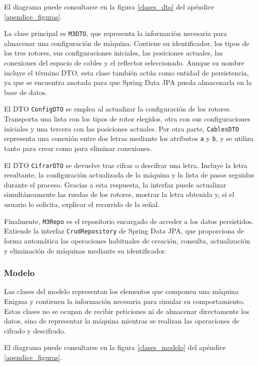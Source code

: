 El diagrama puede consultarse en la figura \ref{clases_dto} del apéndice \ref{apendice_figuras}.

La clase principal es \texttt{M3DTO}, que representa la información necesaria para almacenar una configuración de máquina. Contiene su identificador, los tipos de los tres rotores, sus configuraciones iniciales, las posiciones actuales, las conexiones del espacio de cables y el reflector seleccionado. Aunque su nombre incluye el término DTO, esta clase también actúa como entidad de persistencia, ya que se encuentra anotada para que Spring Data JPA pueda almacenarla en la base de datos.

El DTO \texttt{ConfigDTO} se emplea al actualizar la configuración de los rotores. Transporta una lista con los tipos de rotor elegidos, otra con sus configuraciones iniciales y una tercera con las posiciones actuales. Por otra parte, \texttt{CablesDTO} representa una conexión entre dos letras mediante los atributos \texttt{a} y \texttt{b}, y se utiliza tanto para crear como para eliminar conexiones.

El DTO \texttt{CifrarDTO} se devuelve tras cifrar o descifrar una letra. Incluye la letra resultante, la configuración actualizada de la máquina y la lista de pasos seguidos durante el proceso. Gracias a esta respuesta, la interfaz puede actualizar simultáneamente las ruedas de los rotores, mostrar la letra obtenida y, si el usuario lo solicita, explicar el recorrido de la señal.

Finalmente, \texttt{M3Repo} es el repositorio encargado de acceder a los datos persistidos. Extiende la interfaz \texttt{CrudRepository} de Spring Data JPA, que proporciona de forma automática las operaciones habituales de creación, consulta, actualización y eliminación de máquinas mediante su identificador.

\subsubsection{Modelo}

Las clases del modelo representan los elementos que componen una máquina Enigma y contienen la información necesaria para simular su comportamiento. Estas clases no se ocupan de recibir peticiones ni de almacenar directamente los datos, sino de representar la máquina mientras se realizan las operaciones de cifrado y descifrado.

El diagrama puede consultarse en la figura \ref{clases_modelo} del apéndice \ref{apendice_figuras}.


